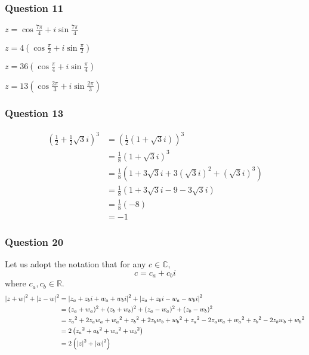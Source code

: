 \documentclass{article}
\begin{document}

\subsubsection{Question 11}

 $z = \cos\frac{7\pi}4 + i\sin\frac{7\pi}{4}$

 $z = 4\left(\cos \frac\pi2 + i\sin \frac\pi2\right)$

 $z = 36\left(\cos \frac\pi4 + i\sin \frac\pi4\right)$

 $z = 13\left(\cos \frac{2\pi}3 + i \sin\frac{2\pi}3 \right)$

\subsubsection{Question 13}
\begin{align*}
\left(\frac12 + \frac12\sqrt3i\right)^3 &= \left(\frac12\left(1+\sqrt3i\right)\right)^3 \\
&= \frac18\left(1+\sqrt3i\right)^3 \\
&= \frac18\left( 1 + 3\sqrt3i+ 3\left(\sqrt3i\right)^2 + \left(\sqrt3i\right)^3 \right) \\
&= \frac18\left( 1 + 3\sqrt3i - 9 - 3\sqrt3i \right) \\
&= \frac18\left(-8\right) \\
&= -1
\end{align*}




\subsubsection{Question 20}

Let us adopt the notation that for any $c\in\mathbb C$, $$c = c_a + c_bi$$ where $c_a,c_b\in\mathbb R$.
\begin{align*}
\left|{z+w}\right|^2+\left|{z-w}\right|^2 &= \left|{z_a+z_bi + w_a+w_bi}\right|^2 + \left|{z_a+z_bi - w_a-w_bi}\right|^2 \\
&= (z_a+w_a)^2+(z_b+w_b)^2+(z_a-w_a)^2+(z_b-w_b)^2 \\
&= {z_a}^2+2z_aw_a+{w_a}^2 + {z_b}^2+2z_bw_b+{w_b}^2 +{z_a}^2-2z_aw_a+{w_a}^2 + {z_b}^2-2z_bw_b+{w_b}^2 \\
&= 2\left({z_a}^2+{a_b}^2+{w_a}^2+{w_b}^2\right)\\
&= 2\left( \left|{z}\right|^2 + \left|{w}\right|^2 \right)
\end{align*}
\end{document}
